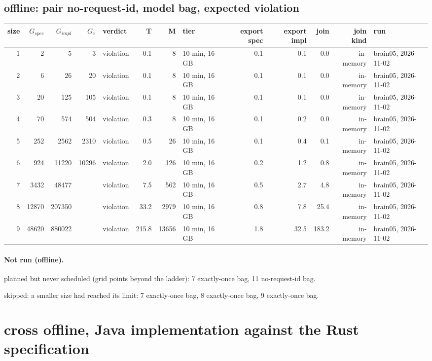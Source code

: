 \documentclass[10pt]{article}
\begin{document}
\subsection*{offline: pair \textsf{no-request-id}, model bag, expected violation}
\begin{longtable}{@{}rrrrlrrlrrrrl@{}}
\toprule
size & $G_{\mathit{spec}}$ & $G_{\mathit{impl}}$ & $G_x$ & verdict & T & M & tier & export spec & export impl & join & join kind & run \\
\midrule
\endhead
\color{red} 1 & 2 & 5 & 3 & violation & 0.1 & 8 & 10 min, 16 GB & 0.1 & 0.1 & 0.0 & in-memory & brain05, 2026-11-02 \\
\color{red} 2 & 6 & 26 & 20 & violation & 0.1 & 8 & 10 min, 16 GB & 0.1 & 0.1 & 0.0 & in-memory & brain05, 2026-11-02 \\
\color{red} 3 & 20 & 125 & 105 & violation & 0.1 & 8 & 10 min, 16 GB & 0.1 & 0.1 & 0.0 & in-memory & brain05, 2026-11-02 \\
\color{red} 4 & 70 & 574 & 504 & violation & 0.3 & 8 & 10 min, 16 GB & 0.1 & 0.2 & 0.0 & in-memory & brain05, 2026-11-02 \\
\color{red} 5 & 252 & 2562 & 2310 & violation & 0.5 & 26 & 10 min, 16 GB & 0.1 & 0.4 & 0.1 & in-memory & brain05, 2026-11-02 \\
\color{red} 6 & 924 & 11220 & 10296 & violation & 2.0 & 126 & 10 min, 16 GB & 0.2 & 1.2 & 0.8 & in-memory & brain05, 2026-11-02 \\
\color{red} 7 & 3432 & 48477 &  & violation & 7.5 & 562 & 10 min, 16 GB & 0.5 & 2.7 & 4.8 & in-memory & brain05, 2026-11-02 \\
\color{red} 8 & 12870 & 207350 &  & violation & 33.2 & 2979 & 10 min, 16 GB & 0.8 & 7.8 & 25.4 & in-memory & brain05, 2026-11-02 \\
\color{red} 9 & 48620 & 880022 &  & violation & 215.8 & 13656 & 10 min, 16 GB & 1.8 & 32.5 & 183.2 & in-memory & brain05, 2026-11-02 \\
\bottomrule
\end{longtable}
\paragraph{Not run (offline).}
planned but never scheduled (grid points beyond the ladder): 7 exactly-once bag, 11 no-request-id bag.\par
skipped: a smaller size had reached its limit: 7 exactly-once bag, 8 exactly-once bag, 9 exactly-once bag.\par
\section*{cross offline, Java implementation against the Rust specification}
\end{document}
